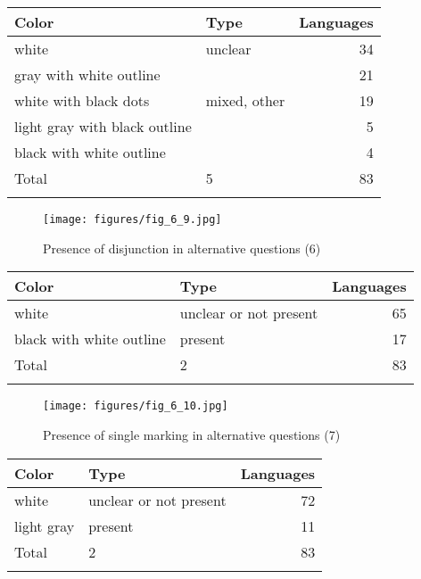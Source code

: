 \begin{table}
\begin{tabularx}{\textwidth}{lQr}
\lsptoprule

\textbf{Color} & \textbf{Type} & \textbf{Languages}\\
\midrule
white & unclear & 34\\
gray with white outline &  & 21\\
white with black dots & mixed, other & 19\\
light gray with black outline &  & 5\\
black with white outline &  & 4\\
\midrule Total & 5 & 83\\
\lspbottomrule
\end{tabularx}
\end{table}

\clearpage %
\begin{figure}
\texttt{[image: figures/fig\_6\_9.jpg]}
\caption{Presence of disjunction in alternative questions (6)}
\label{fig:6:9}
\end{figure}

\begin{table}
\begin{tabularx}{\textwidth}{lQr}
\lsptoprule

\textbf{Color} & \textbf{Type} & \textbf{Languages}\\
\midrule
white & unclear or not present & 65\\
black with white outline & present & 17\\
\midrule Total & 2 & 83\\
\lspbottomrule
\end{tabularx}
\end{table}

\clearpage %
\begin{figure}
\texttt{[image: figures/fig\_6\_10.jpg]}
\caption{Presence of single marking in alternative questions (7)}
\label{fig:6:10}
\end{figure}

\begin{table}
\begin{tabularx}{\textwidth}{lQr}
\lsptoprule

\textbf{Color} & \textbf{Type} & \textbf{Languages}\\
\midrule
white & unclear or not present & 72\\
light gray & present & 11\\
\midrule Total & 2 & 83\\
\lspbottomrule
\end{tabularx} 
\end{table}

